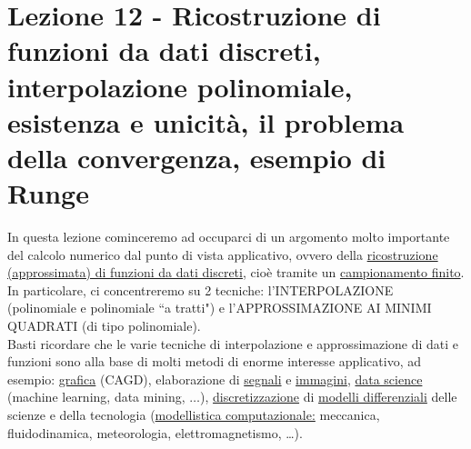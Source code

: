 \section[Lezione 12 - Interpolazione polinomiale]{Lezione 12 - Ricostruzione di funzioni da dati discreti, interpolazione polinomiale, esistenza e unicità, il problema della convergenza, esempio di Runge}

In questa lezione cominceremo ad occuparci di un argomento molto importante del calcolo numerico dal punto di vista applicativo, ovvero della \uline{ricostruzione (approssimata) di funzioni da dati discreti}, cioè tramite un \uline{campionamento finito}.\\
In particolare, ci concentreremo su 2 tecniche: l'INTERPOLAZIONE (polinomiale e polinomiale ``a tratti") e l'APPROSSIMAZIONE AI MINIMI QUADRATI (di tipo polinomiale).\\
Basti ricordare che le varie tecniche di interpolazione e approssimazione di dati e funzioni sono alla base di molti metodi di enorme interesse applicativo, ad esempio: \uline{grafica} (CAGD), elaborazione di \uline{segnali} e \uline{immagini}, \uline{data science} (machine learning, data mining, $\dotsc$), \uline{discretizzazione} di \uline{modelli differenziali} delle scienze e della tecnologia (\uline{modellistica computazionale:} meccanica, fluidodinamica, meteorologia, elettromagnetismo, \dots).

